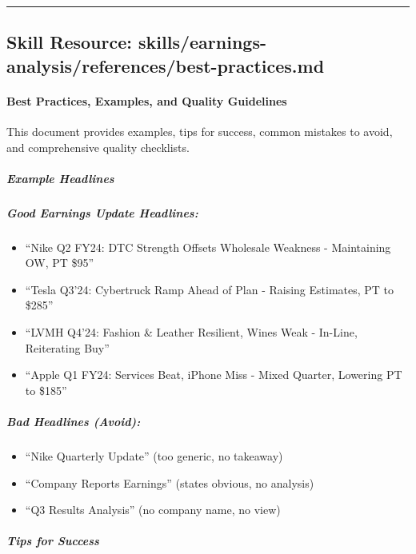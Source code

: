\documentclass[11pt]{article}
\begin{document}
\vspace{0.8em}\hrule\vspace{0.8em}

\subsection{Skill Resource: skills/earnings-analysis/references/best-practices.md}\label{file:skills-earnings-analysis-references-best-practices-md}

\paragraph{Best Practices, Examples, and Quality Guidelines}\mbox{}\par

This document provides examples, tips for success, common mistakes to avoid, and comprehensive quality checklists.


\subparagraph{Example Headlines}\mbox{}\par

\subparagraph{Good Earnings Update Headlines:}\mbox{}\par
\begin{itemize}[leftmargin=*,itemsep=2pt,topsep=2pt]
\item {} ``Nike Q2 FY24: DTC Strength Offsets Wholesale Weakness - Maintaining OW, PT \$95''
\item {} ``Tesla Q3'24: Cybertruck Ramp Ahead of Plan - Raising Estimates, PT to \$285''
\item {} ``LVMH Q4'24: Fashion \& Leather Resilient, Wines Weak - In-Line, Reiterating Buy''
\item {} ``Apple Q1 FY24: Services Beat, iPhone Miss - Mixed Quarter, Lowering PT to \$185''
\end{itemize}

\subparagraph{Bad Headlines (Avoid):}\mbox{}\par
\begin{itemize}[leftmargin=*,itemsep=2pt,topsep=2pt]
\item {} ``Nike Quarterly Update'' (too generic, no takeaway)
\item {} ``Company Reports Earnings'' (states obvious, no analysis)
\item {} ``Q3 Results Analysis'' (no company name, no view)
\end{itemize}

\subparagraph{Tips for Success}\mbox{}\par
\end{document}
